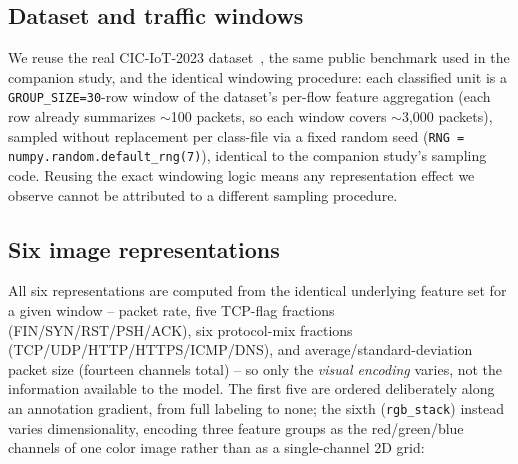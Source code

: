 \documentclass[twocolumn]{svjour3}
\begin{document}
\subsection{Dataset and traffic windows}

We reuse the real CIC-IoT-2023 dataset~\cite{cic-iot-2023}, the same public benchmark used in the
companion study, and the identical windowing procedure: each classified unit is a
\texttt{GROUP\_SIZE=30}-row window of the dataset's per-flow feature aggregation (each row already
summarizes $\sim$100 packets, so each window covers $\sim$3,000 packets), sampled without
replacement per class-file via a fixed random seed (\texttt{RNG = numpy.random.default\_rng(7)}),
identical to the companion study's sampling code. Reusing the exact windowing logic means any
representation effect we observe cannot be attributed to a different sampling procedure.

\subsection{Six image representations}
\label{sec:representations}

All six representations are computed from the identical underlying feature set for a given window
-- packet rate, five TCP-flag fractions (FIN/SYN/RST/PSH/ACK), six protocol-mix fractions
(TCP/UDP/HTTP/HTTPS/ICMP/DNS), and average/standard-deviation packet size (fourteen channels total)
-- so only the \emph{visual encoding} varies, not the information available to the model. The first
five are ordered deliberately along an annotation gradient, from full labeling to none; the sixth
(\texttt{rgb\_stack}) instead varies dimensionality, encoding three feature groups as the
red/green/blue channels of one color image rather than as a single-channel 2D grid:
\end{document}
